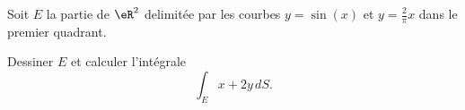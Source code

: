 \begin{exercice}\label{exocontrolecontinu0010}

Soit $E$ la partie de $\eR^2$ delimitée par les courbes $y=\sin(x)$ et $y=\frac{2}{\pi}x$ dans le premier quadrant. 

Dessiner $E$ et calculer l'intégrale 
\[
\int_{E}x+2y \, dS.
\]

  
\end{exercice}
